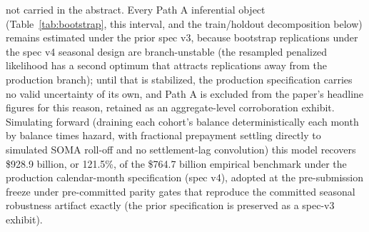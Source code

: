 \documentclass[12pt]{article}
\begin{document}
not carried in the abstract. Every Path A inferential object (Table~\ref{tab:bootstrap}, this interval, and the train/holdout decomposition below) remains estimated under the prior spec v3, because bootstrap replications under the spec v4 seasonal design are branch-unstable (the resampled penalized likelihood has a second optimum that attracts replications away from the production branch); until that is stabilized, the production specification carries no valid uncertainty of its own, and Path A is excluded from the paper's headline figures for this reason, retained as an aggregate-level corroboration exhibit. Simulating forward (draining each cohort's balance deterministically each month by balance times hazard, with fractional prepayment settling directly to simulated SOMA roll-off and no settlement-lag convolution) this model recovers \$928.9 billion, or 121.5\%, of the \$764.7 billion empirical benchmark under the production calendar-month specification (spec v4), adopted at the pre-submission freeze under pre-committed parity gates that reproduce the committed seasonal robustness artifact exactly (the prior specification is preserved as a spec-v3 exhibit).
\end{document}
